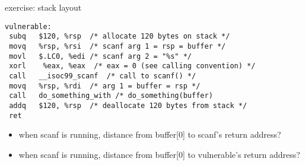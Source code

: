 \begin{frame}[fragile,label=smashExStackLayoutExer]{exercise: stack layout}
\lstset{language=myasm,style=small}
\begin{lstlisting}
vulnerable:
 subq	$120, %rsp  /* allocate 120 bytes on stack */
 movq	%rsp, %rsi  /* scanf arg 1 = rsp = buffer */
 movl	$.LC0, %edi /* scanf arg 2 = "%s" */
 xorl    %eax, %eax  /* eax = 0 (see calling convention) */
 call	__isoc99_scanf  /* call to scanf() */
 movq	%rsp, %rdi  /* arg 1 = buffer = rsp */
 call	do_something_with /* do_something(buffer)
 addq	$120, %rsp  /* deallocate 120 bytes from stack */
 ret
\end{lstlisting}
\begin{itemize}
\item when scanf is running, distance from buffer[0] to scanf's return address?
\item when scanf is running, distance from buffer[0] to vulnerable's return address?
\end{itemize}
\end{frame}

